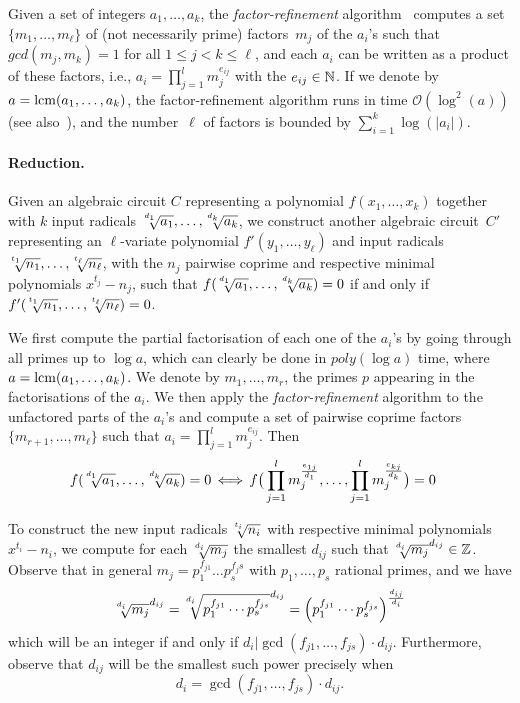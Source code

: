 
Given a set of integers $a_1,\ldots,a_k$, the \emph{factor-refinement} algorithm~\cite{BACH1993199} computes a set~$\{m_1,\ldots,m_{\ell}\}$ of (not necessarily prime) factors~$m_j$ of the $a_i$'s such that 
 $gcd(m_j,m_k)=1$ for all $1\leq j<k\leq \ell$, and each $a_i$ can be written as a product of these factors, i.e.,  $a_i = \prod_{j=1}^{l} m_j^{e_{ij}}$ with the $e_{ij}\in\mathbb{N}$. If we denote by $a = \operatorname{lcm}(a_1,\ldots,a_k)$, the factor-refinement algorithm runs in time $\mathcal{O}(\log^2(a))$(see also~\cite[Lemma 3.1]{blomer98}), and the number~$\ell$ of factors is bounded by $\sum_{i=1}^{k} \log(|a_i|)$. 
  
 \paragraph{Reduction.}
 Given an algebraic circuit $C$ representing a polynomial $f(x_1,\ldots,x_k)$ together with $k$ input radicals $\mysqrt{d_1}{a_1},\ldots,\mysqrt{d_k}{a_k}$, we construct another algebraic circuit~$C'$ representing an $\ell$-variate polynomial $f'(y_1,\ldots,y_{\ell})$ and input radicals $\mysqrt{t_1}{n_1},\ldots,\mysqrt{t_\ell}{n_\ell}$, with the $n_j$ pairwise coprime and respective minimal polynomials $x^{t_j}-n_j$, such that 
$f(\mysqrt{d_1}{a_1},\ldots,\mysqrt{d_k}{a_k})=0$ if and only if $f'(\mysqrt{t_1}{n_1},\ldots,\mysqrt{t_\ell}{n_\ell})=0$.

We first compute the partial factorisation of each one of the $a_i$'s by going through all primes up to $\log a$, which can clearly be done in $poly(\log a)$ time, where $a = \operatorname{lcm}(a_1,\ldots,a_k)$. We denote by $m_1,\ldots,m_r$, the primes $p$ appearing in the factorisations of the $a_i$. We then apply the \emph{factor-refinement} algorithm to the unfactored parts of the $a_i$'s 
and compute a set of pairwise coprime factors $\{m_{r+1},\ldots,m_\ell\}$ such that $a_i=\prod_{j=1}^{l} m_j^{e_{ij}}$. Then  
\begin{align*}
	f(\mysqrt{d_1}{a_1},\ldots,\mysqrt{d_k}{a_k})=0 \, & \Longleftrightarrow \, f\big(\prod_{j=1}^{l} m_j^{\frac{e_{1j}}{d_1}},\ldots,\prod_{j=1}^{l} m_j^{\frac{e_{kj}}{d_k}}\big)=0
\end{align*}


To construct the new input radicals $\mysqrt{t_i}{n_i}$ with respective minimal polynomials $x^{t_i}-n_i$, we compute for each $\mysqrt{d_i}{m_j}$ the smallest $d_{ij}$ such that $\mysqrt{d_i}{m_j}^{d_{ij}}\in\ZZ$. Observe that in general $m_j= p_1^{f_{j1}} \ldots p_s^{f_js}$ with $p_1,\ldots,p_s$ rational primes, and we have
\[\mysqrt{d_i}{m_j}^{d_{ij}} =
  \mysqrt{d_i}{p_1^{f_{j1}} \cdots p_s^{f_{js}}}^{d_{ij}} =
  \left( p_1^{f_{j1}} \cdots p_s^{f_{js}} \right) ^ {\frac{d_{ij}}{d_i}}
\]
which will be an integer if and only if $d_{i} | \gcd(f_{j1}, \ldots, f_{js}) \cdot d_{ij}$. Furthermore, observe that $d_{ij}$ will be the smallest such power precisely when
\begin{equation}\label{eq:di_gcd_dij}
    d_{i} = \gcd(f_{j1}, \ldots, f_{js}) \cdot d_{ij}.
\end{equation}

